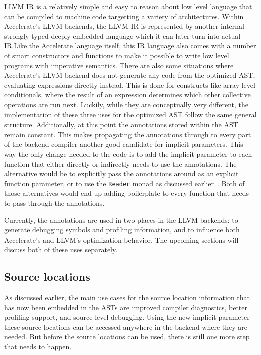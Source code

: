 \documentclass[fontsize=11pt,a4paper,parskip=half,numbers=noenddot]{scrartcl}
\newcommand{\hask}[1]{\texttt{#1}}
\begin{document}
LLVM IR is a relatively simple and easy to reason about low level language that
can be compiled to machine code targetting a variety of architectures. Within
Accelerate's LLVM backends, the LLVM IR is represented by another internal
strongly typed deeply embedded language which it can later turn into actual
IR.\@ Like the Accelerate language itself, this IR language also comes with a
number of smart constructors and functions to make it possible to write low
level programs with imperative semantics. There are also some situations where
Accelerate's LLVM backend does not generate any code from the optimized AST,
evaluating expressions directly instead. This is done for constructs like
array-level conditionals, where the result of an expression determines which
other collective operations are run next. Luckily, while they are conceptually
very different, the implementation of these three uses for the optimized AST
follow the same general structure. Additionally, at this point the annotations
stored within the AST remain constant. This makes propagating the annotations
through to every part of the backend compiler another good candidate for
implicit parameters. This way the only change needed to the code is to add the
implicit parameter to each function that either directly or indirectly needs to
use the annotations. The alternative would be to explicitly pass the annotations
around as an explicit function parameter, or to use the \hask{Reader} monad as
discussed earlier~\cite{jones1995functionalprogramming}. Both of those
alternatives would end up adding boilerplate to every function that needs to
pass through the annotations.

Currently, the annotations are used in two places in the LLVM backends: to
generate debugging symbols and profiling information, and to influence both
Accelerate's and LLVM's optimization behavior. The upcoming sections will
discuss both of these uses separately.

\subsection{Source locations}

As discussed earlier, the main use cases for the source location information
that has now been embedded in the ASTs are improved compiler diagnostics, better
profiling support, and source-level debugging. Using the new implicit parameter
these source locations can be accessed anywhere in the backend where they are
needed. But before the source locations can be used, there is still one more
step that needs to happen.
\end{document}
